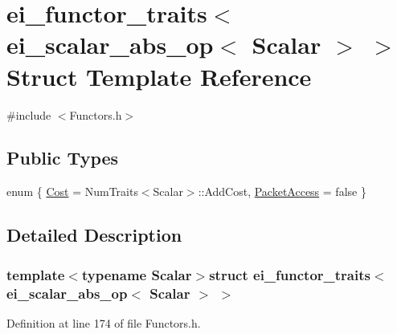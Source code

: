 \hypertarget{structei__functor__traits_3_01ei__scalar__abs__op_3_01_scalar_01_4_01_4}{\section{ei\-\_\-functor\-\_\-traits$<$ ei\-\_\-scalar\-\_\-abs\-\_\-op$<$ Scalar $>$ $>$ Struct Template Reference}
\label{structei__functor__traits_3_01ei__scalar__abs__op_3_01_scalar_01_4_01_4}
}


{\ttfamily \#include $<$Functors.\-h$>$}

\subsection*{Public Types}
\begin{DoxyCompactItemize}
\item 
enum \{ \hyperlink{structei__functor__traits_3_01ei__scalar__abs__op_3_01_scalar_01_4_01_4_acf40ffae33410861500c76852da7a6dda3fe4919e80ef53661e3b8168773543fe}{Cost} = Num\-Traits$<$Scalar$>$\-:\-:Add\-Cost, 
\hyperlink{structei__functor__traits_3_01ei__scalar__abs__op_3_01_scalar_01_4_01_4_acf40ffae33410861500c76852da7a6ddad0e4db7ce280cbdf8ad1289c050f78e7}{Packet\-Access} = false
 \}
\end{DoxyCompactItemize}


\subsection{Detailed Description}
\subsubsection*{template$<$typename Scalar$>$struct ei\-\_\-functor\-\_\-traits$<$ ei\-\_\-scalar\-\_\-abs\-\_\-op$<$ Scalar $>$ $>$}



Definition at line 174 of file Functors.\-h.



